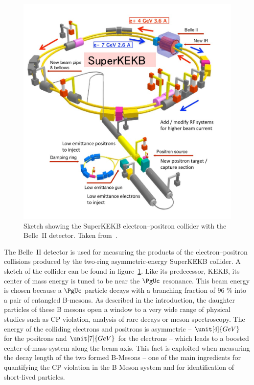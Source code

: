 \begin{figure}
 \centering
 \includegraphics[height=0.4\textheight]{figures/experimental_setup/superkekb.jpg}
 \caption[Sketch showing the SuperKEKB electron--positron collider.]{Sketch showing the SuperKEKB electron--positron collider with the Belle~II detector. Taken from~\cite{DesyWebseite}.}
 \label{fig-superkekb}
\end{figure}


The Belle~II detector is used for measuring the products of the electron--positron collisions produced by the two-ring asymmetric-energy SuperKEKB collider. A sketch of the collider can be found in figure~\ref{fig-superkekb}. Like its predecessor, KEKB, its center of mass energy is tuned to be near the $\PgUc$ resonance. This beam energy is chosen because a $\PgUc$ particle decays with a branching fraction of 96 \% into a pair of entangled B-mesons. As described in the introduction, the daughter particles of these B mesons open a window to a very wide range of physical studies such as CP violation, analysis of rare decays or meson spectroscopy. The energy of the colliding electrons and positrons is asymmetric -- $\unit[4]{GeV}$ for the positrons and $\unit[7]{GeV}$ for the electrons -- which leads to a boosted center-of-mass-system along the beam axis. This fact is exploited when measuring the decay length of the two formed B-Mesons -- one of the main ingredients for quantifying the CP violation in the B Meson system and for identification of short-lived particles. 

